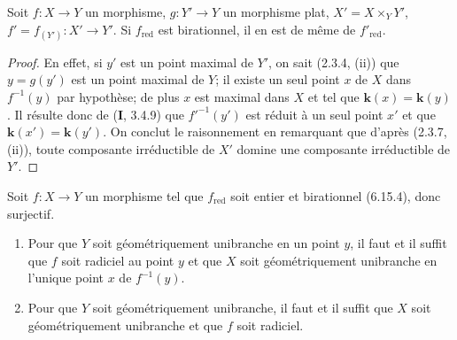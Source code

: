 \begin{lemma}[6.15.4.1]
\label{IV.2.s6.15.4.1-fr}
Soit $f:X\to Y$ un morphisme, $g:Y'\to Y$ un morphisme plat,
$X'=X\times_Y Y'$, $f'=f_{(Y')}:X'\to Y'$. Si $f_{\mathrm{red}}$ est
birationnel, il en est de même de $f'_{\mathrm{red}}$.
\end{lemma}

\begin{proof}
En effet, si $y'$ est un point maximal de $Y'$, on sait (2.3.4, (ii)) que
$y=g(y')$ est un point maximal de $Y$; il existe un seul point $x$ de $X$
dans $f^{-1}(y)$ par hypothèse; de plus $x$ est maximal dans $X$ et tel que
$\boldsymbol{k}(x)=\boldsymbol{k}(y)$. Il résulte donc de (\textbf{I}, 3.4.9) que $f'^{-1}(y')$ est réduit à
un seul point $x'$ et que $\boldsymbol{k}(x')=\boldsymbol{k}(y')$. On conclut le raisonnement en
remarquant que d'après (2.3.7, (ii)), toute composante irréductible de $X'$
domine une composante irréductible de $Y'$.
\end{proof}

\begin{proposition}[6.15.5]
\label{IV.2.s6.15.5-fr}
Soit $f:X\to Y$ un morphisme tel que $f_{\mathrm{red}}$ soit entier et
birationnel \textup{(6.15.4)}, donc surjectif.
\begin{enumerate}
\item[\textup{(i)}] Pour que $Y$ soit géométriquement unibranche en un point $y$,
il faut et il suffit que $f$ soit radiciel au point $y$ et que $X$ soit
géométriquement unibranche en l'unique point $x$ de $f^{-1}(y)$.
\item[\textup{(ii)}] Pour que $Y$ soit géométriquement unibranche, il faut et il
suffit que $X$ soit géométriquement unibranche et que $f$ soit radiciel.
\end{enumerate}
\end{proposition}

